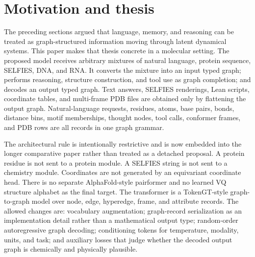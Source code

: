 \documentclass[11pt]{article}
\newcommand{\1}{\mathbf{1}}
\begin{document}
\section{Motivation and thesis}

The preceding sections argued that language, memory, and reasoning can be treated as graph-structured information moving through latent dynamical systems. This paper makes that thesis concrete in a molecular setting. The proposed model receives arbitrary mixtures of natural language, protein sequence, SELFIES, DNA, and RNA. It converts the mixture into an input typed graph; performs reasoning, structure construction, and tool use as graph completion; and decodes an output typed graph. Text answers, SELFIES renderings, Lean scripts, coordinate tables, and multi-frame PDB files are obtained only by flattening the output graph. Natural-language requests, residues, atoms, base pairs, bonds, distance bins, motif memberships, thought nodes, tool calls, conformer frames, and PDB rows are all records in one graph grammar.

The architectural rule is intentionally restrictive and is now embedded into the longer comparative paper rather than treated as a detached proposal. A protein residue is not sent to a protein module. A SELFIES string is not sent to a chemistry module. Coordinates are not generated by an equivariant coordinate head. There is no separate AlphaFold-style pairformer and no learned VQ structure alphabet as the final target. The transformer is a TokenGT-style graph-to-graph model over node, edge, hyperedge, frame, and attribute records. The allowed changes are: vocabulary augmentation; graph-record serialization as an implementation detail rather than a mathematical output type; random-order autoregressive graph decoding; conditioning tokens for temperature, modality, units, and task; and auxiliary losses that judge whether the decoded output graph is chemically and physically plausible.
\end{document}
